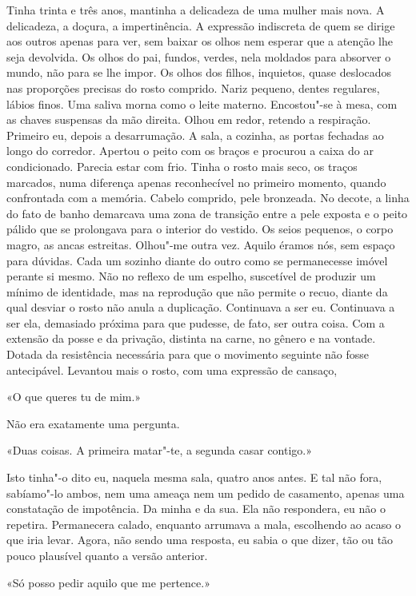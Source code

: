 Tinha trinta e três anos, mantinha a delicadeza de uma mulher mais nova.
A delicadeza, a doçura, a impertinência. A expressão indiscreta de quem
se dirige aos outros apenas para ver, sem baixar os olhos nem esperar
que a atenção lhe seja devolvida. Os olhos do pai, fundos, verdes, nela
moldados para absorver o mundo, não para se lhe impor. Os olhos dos
filhos, inquietos, quase deslocados nas proporções precisas do rosto
comprido. Nariz pequeno, dentes regulares, lábios finos. Uma saliva
morna como o leite materno. Encostou"-se à mesa, com as chaves suspensas
da mão direita. Olhou em redor, retendo a respiração. Primeiro eu,
depois a desarrumação. A sala, a cozinha, as portas fechadas ao longo do
corredor. Apertou o peito com os braços e procurou a caixa do ar
condicionado. Parecia estar com frio. Tinha o rosto mais seco, os traços
marcados, numa diferença apenas reconhecível no primeiro momento, quando
confrontada com a memória. Cabelo comprido, pele bronzeada. No decote, a
linha do fato de banho demarcava uma zona de transição entre a pele
exposta e o peito pálido que se prolongava para o interior do vestido.
Os seios pequenos, o corpo magro, as ancas estreitas. Olhou"-me outra
vez. Aquilo éramos nós, sem espaço para dúvidas. Cada um sozinho diante
do outro como se permanecesse imóvel perante si mesmo. Não no reflexo de
um espelho, suscetível de produzir um mínimo de identidade, mas na
reprodução que não permite o recuo, diante da qual desviar o rosto não
anula a duplicação. Continuava a ser eu. Continuava a ser ela, demasiado
próxima para que pudesse, de fato, ser outra coisa. Com a extensão da
posse e da privação, distinta na carne, no gênero e na vontade. Dotada
da resistência necessária para que o movimento seguinte não fosse
antecipável. Levantou mais o rosto, com uma expressão de cansaço,

«O que queres tu de mim.»

Não era exatamente uma pergunta.

«Duas coisas. A primeira matar"-te, a segunda casar contigo.»

Isto tinha"-o dito eu, naquela mesma sala, quatro anos antes. E tal não
fora, sabíamo"-lo ambos, nem uma ameaça nem um pedido de casamento,
apenas uma constatação de impotência. Da minha e da sua. Ela não
respondera, eu não o repetira. Permanecera calado, enquanto arrumava a
mala, escolhendo ao acaso o que iria levar. Agora, não sendo uma
resposta, eu sabia o que dizer, tão ou tão pouco plausível quanto a
versão anterior.

«Só posso pedir aquilo que me pertence.»

